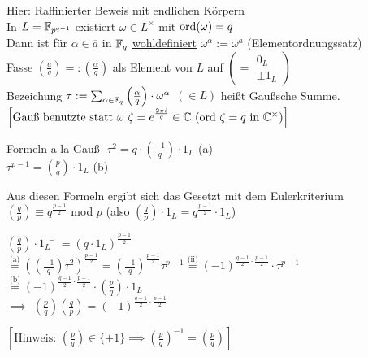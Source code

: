 \documentclass[a4paper,twoside,DIV15,BCOR12mm]{scrbook}
\begin{document}
\begin{beweis}
Hier: Raffinierter Beweis mit endlichen Körpern\\
In $L = \mathbb{F}_{p^{q-1}}$ existiert $\omega \in L^\times$ mit $\mathop{\rm ord}\nolimits(\omega)=q$\\
Dann ist für $\alpha \in \overline a$ in $\mathbb{F}_q$ \underline{wohldefiniert} $\omega^\alpha:=\omega^a$ (Elementordnungssatz) \\
Fasse $\left(\frac{a}{q}\right) =: \left(\frac{\alpha}{q}\right)$ als Element von $L$ auf $\left(=\begin{array}{l} 0_L \\ \pm 1_L \end{array}\right)$ \\
Bezeichung $\tau := \sum_{\alpha \in \mathbb{F}_q}\left(\frac{\alpha}{q}\right) \cdot \omega^\alpha$ $(\in L)$ heißt Gaußsche Summe.\\
$\left[ \mbox{Gauß benutzte statt $\omega$ $\zeta=e^\frac{2\pi i}{q} \in \mathbb{C}$ (ord $\zeta=q$ in $\mathbb{C}^\times$)} \right]$ \\
\begin{tabbing}
Formeln a la Gauß \= $\tau^2=q \cdot \left(\frac{-1}{q}\right) \cdot 1_L$ \= (a) \\
                  \> $\tau^{p-1} = \left(\frac{p}{q}\right) \cdot 1_L$    \> (b)
\end{tabbing}
Aus diesen Formeln ergibt sich das Gesetzt mit dem Eulerkriterium \\
$\left(\frac{q}{p}\right) \equiv q^\frac{p-1}{2}$ mod $p$ (also $\left(\frac{q}{p}\right) \cdot 1_L = q^\frac{p-1}{2} \cdot 1_L$)\\
\begin{tabbing}
$\left(\frac{q}{p}\right) \cdot 1_L$ \= $= (q \cdot 1_L)^\frac{p-1}{2}$ \\
                                     \> $\stackrel{\mbox{(a)}}{=} \left(\left(\frac{-1}{q}\right)\tau^2\right)^\frac{p-1}{2} = \left(\frac{-1}{q}\right)^\frac{p-1}{2}\tau^{p-1} \stackrel{\mbox{(ii)}}{=} (-1)^{\frac{q-1}{2} \cdot \frac{p-1}{2}} \cdot \tau^{p-1}$ \\
                                     \> $\stackrel{\mbox{(b)}}{=} (-1)^{\frac{q-1}{2} \cdot \frac{p-1}{2}}\cdot \left(\frac{p}{q}\right) \cdot 1_L$ \\
                                     \> $\implies$ $\left(\frac{p}{q}\right)\left(\frac{q}{p}\right)=(-1)^{\frac{q-1}{2} \cdot \frac{p-1}{2}}$
\end{tabbing}
$\left[\mbox{Hinweis: } \left(\frac{p}{q}\right) \in \{\pm 1 \} \implies \left(\frac{p}{q}\right)^{-1} = \left(\frac{p}{q}\right) \right]$ \\

\end{beweis}
\end{document}
